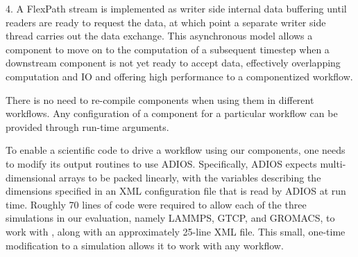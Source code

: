 4. A FlexPath stream is implemented as
writer side internal data buffering 
until readers are ready to request the data,
at which point a separate writer side thread carries out the data exchange.
This asynchronous model allows a 
\sys component to move on to the computation
of a subsequent timestep when a downstream
component is not yet ready to accept data,
effectively overlapping computation and IO
and offering high performance to a componentized workflow.

There is no need to re-compile \sys components when using them
in different workflows. Any configuration
of a component for a particular workflow
can be provided through run-time arguments.

To enable a scientific code to drive a workflow using our
\sys components, one needs to modify its output routines to use ADIOS.
Specifically, ADIOS expects multi-dimensional
arrays to be packed linearly, with the variables
describing the dimensions
specified in an XML configuration file
that is read by ADIOS at run time.
Roughly 70 lines of code were required
to allow each of the three simulations
in our evaluation, namely LAMMPS, GTCP, and GROMACS,
to work with \sys,
along with an approximately 25-line
XML file.
This small, one-time modification to a simulation allows it to work with any
\sys workflow.
